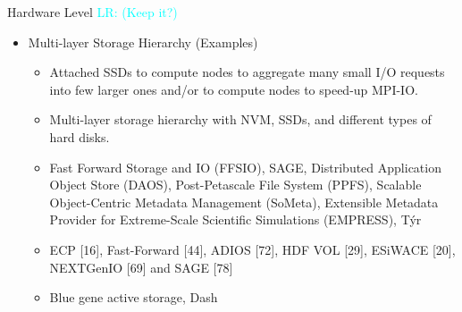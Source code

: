 \documentclass[compress,11pt,xcolor=svgnames,aspectratio=169]{beamer}
\newcommand{\lr}[1]{\textcolor{cyan}{LR: #1}}
\begin{document}
\begin{frame}[fragile] {Hardware Level \lr{(Keep it?)}}

\begin{itemize}

      \item Multi-layer Storage Hierarchy (Examples)\\[0.4cm]

        \begin{itemize}
        \setlength\itemsep{0.6cm}

        \item Attached SSDs to compute nodes to aggregate many small I/O requests into few larger ones and/or to compute nodes to speed-up MPI-IO.

        \item Multi-layer storage hierarchy with NVM, SSDs, and different types of hard disks. %

        \item Fast Forward Storage and IO (FFSIO), SAGE, Distributed Application Object Store (DAOS), Post-Petascale File System (PPFS), Scalable Object-Centric Metadata Management (SoMeta), Extensible Metadata Provider for Extreme-Scale Scientific Simulations (EMPRESS), Týr

        \item ECP [16], Fast-Forward [44], ADIOS [72], HDF VOL [29], ESiWACE [20], NEXTGenIO [69] and SAGE [78]

        \item Blue gene active storage, Dash

        \end{itemize}

\end{itemize}

\nocite{3372390}

\end{frame}
\end{document}
